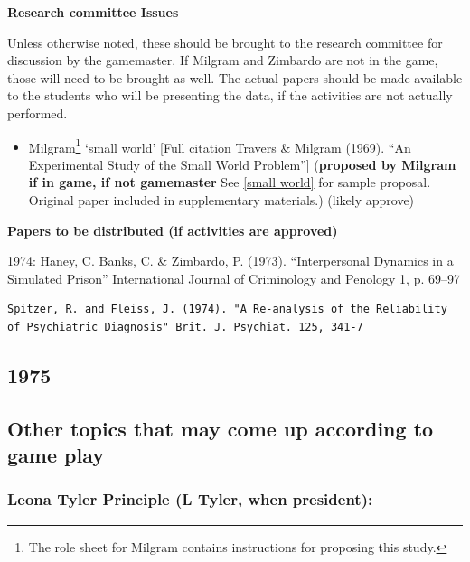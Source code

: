 \begin{refsection}
\textbf{Research committee Issues}

Unless otherwise noted, these should be brought to the research committee for discussion by the gamemaster. If Milgram and Zimbardo are not in the game, those will need to be brought as well. The actual papers should be made available to the students who will be presenting the data, if the activities are not actually performed.

\begin{itemize}
\item Milgram\footnote{The role sheet for Milgram contains instructions for proposing this study.} `small world' [Full citation Travers \& Milgram (1969). ``An Experimental Study of the Small World Problem''] (\textbf{proposed by Milgram if in game, if not gamemaster} See \ref{small world} for sample proposal. Original paper included in supplementary materials.) (likely approve)

\end{itemize}

\textbf{Papers to be distributed (if activities are approved)}

1974: Haney, C. Banks, C. \& Zimbardo, P. (1973). ``Interpersonal Dynamics in a Simulated Prison'' International Journal of Criminology and Penology 1, p. 69--97 

\begin{verbatim}
Spitzer, R. and Fleiss, J. (1974). "A Re-analysis of the Reliability of Psychiatric Diagnosis" Brit. J. Psychiat. 125, 341-7
\end{verbatim}

\newpage

\subsection{1975}
\label{1975}

\newpage

\subsection{Other topics that may come up according to game play}
\label{othertopicsthatmaycomeupaccordingtogameplay}

\subsubsection{Leona Tyler Principle (L Tyler, when president):}
\label{leonatylerprincipleltylerwhenpresident:}


\end{refsection}

